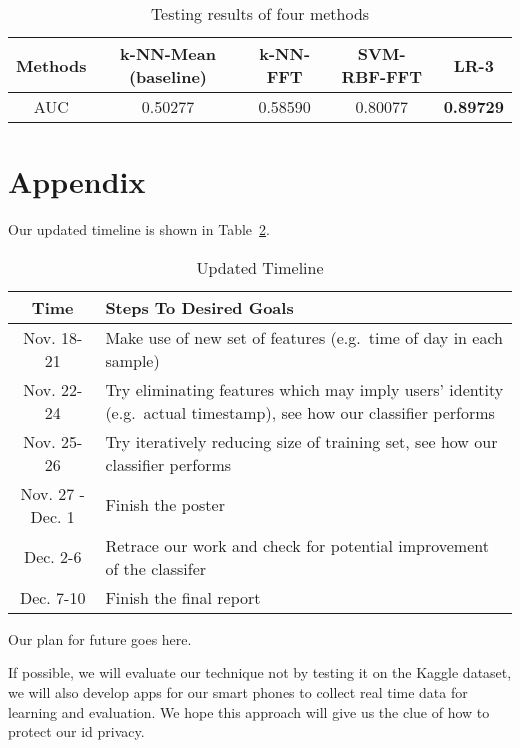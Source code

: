 \documentclass{article} %
\begin{document}
\begin{table}[!ht]
\caption{Testing results of four methods}
\label{tbl:test_result}
	\begin{center}
		\begin{tabular}{ c | c  c  c  c }
			\hline
			 Methods & k-NN-Mean (baseline) & k-NN-FFT & SVM-RBF-FFT & LR-3 \\
			 \hline
			 AUC & 0.50277 & 0.58590 & 0.80077 & \textbf{0.89729} \\
			 \hline
		\end{tabular}
	\end{center}
\end{table}

\section*{Appendix}

Our updated timeline is shown in Table~\ref{tbl:timeline}.

\begin{table}[!ht]
\caption{Updated Timeline}
\label{tbl:timeline}
    \begin{center}
        \begin{tabular}{ c | p{300pt} }
            \hline
             Time & Steps To Desired Goals \\
             \hline
             Nov. 18-21 & Make use of new set of features (e.g.\ time of day in each sample) \\
             \hline
             Nov. 22-24 & Try eliminating features which may imply users' identity (e.g.\ actual timestamp), see how our classifier performs \\
             \hline
             Nov. 25-26 & Try iteratively reducing size of training set, see how our classifier performs \\
             \hline
             Nov. 27 - Dec. 1 & Finish the poster \\
             \hline
             Dec. 2-6 & Retrace our work and check for potential improvement of the classifer \\
             \hline
             Dec. 7-10 & Finish the final report \\
             \hline
        \end{tabular}
    \end{center}
\end{table}

Our plan for future goes here.

If possible, we will evaluate our technique not by testing it on the Kaggle dataset, we will also develop apps for our smart phones to collect real time data for learning and evaluation. We hope this approach will give us the clue of how to protect our id privacy.
\end{document}
